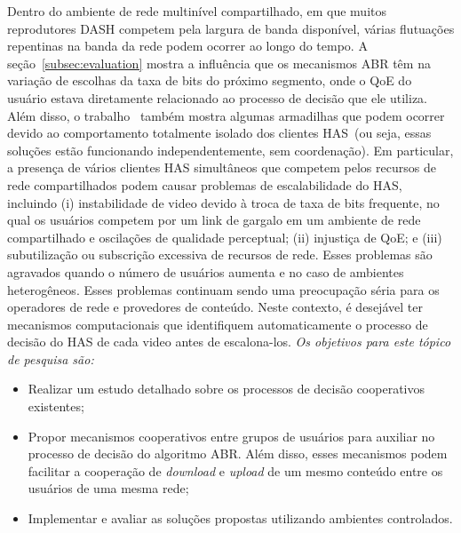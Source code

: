 Dentro do ambiente de rede multinível compartilhado, em que muitos reprodutores DASH competem pela largura de banda disponível, várias flutuações repentinas na banda da rede podem ocorrer ao longo do tempo.
% 
A seção~\ref{subsec:evaluation} mostra a influência que os mecanismos ABR têm na variação de escolhas da taxa de bits do próximo segmento, onde o QoE do usuário estava diretamente relacionado ao processo de decisão que ele utiliza. Além disso, o trabalho~\cite{bentaleb:2018:MSys} também mostra algumas armadilhas que podem ocorrer devido ao comportamento totalmente isolado dos clientes HAS~(ou seja, essas soluções estão funcionando independentemente, sem coordenação). Em particular, a presença de vários clientes HAS simultâneos que competem pelos recursos de rede compartilhados podem causar problemas de escalabilidade do HAS, incluindo (i) instabilidade de video devido à troca de taxa de bits frequente, no qual os usuários competem por um link de gargalo em um ambiente de rede compartilhado e oscilações de qualidade perceptual; (ii) injustiça de QoE; e (iii) subutilização ou subscrição excessiva de recursos de rede. Esses problemas são agravados quando o número de usuários aumenta e no caso de ambientes heterogêneos. Esses problemas continuam sendo uma preocupação séria para os operadores de rede e provedores de conteúdo. 
Neste contexto, é desejável ter mecanismos computacionais que identifiquem automaticamente o processo de decisão do HAS de cada video antes de escalona-los.
\emph{Os objetivos para este tópico de pesquisa são:}

\begin{itemize}
    \item Realizar um estudo detalhado sobre os processos de decisão cooperativos existentes;
    \item Propor mecanismos cooperativos entre grupos de usuários para auxiliar no processo de decisão do algoritmo ABR. Além disso, esses mecanismos podem facilitar a cooperação de \textit{download} e \textit{upload} de um mesmo conteúdo entre os usuários de uma mesma rede; 
    \item Implementar e avaliar as soluções propostas utilizando ambientes controlados.
\end{itemize}


